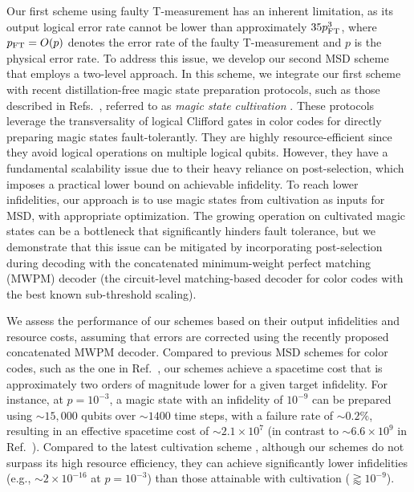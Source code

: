 \documentclass[
 prx,
 reprint,
 superscriptaddress,
 longbibliography,
 dvipsnames
]{revtex4-2}
\begin{document}
\label{para:ourfirstscheme}
Our first scheme using faulty T-measurement has an inherent limitation, as its output logical error rate cannot be lower than approximately $35p_{\mathrm{FT}}^3$, where $p_{\mathrm{FT}} = O(p)$ denotes the error rate of the faulty T-measurement and $p$ is the physical error rate.
To address this issue, we develop our second MSD scheme that employs a two-level approach. 
In this scheme, we integrate our first scheme with recent distillation-free magic state preparation protocols, such as those described in Refs.~\cite{chamberland2020very,itogawa2024even,gidney2024magic}, referred to as \textit{magic state cultivation} \cite{gidney2024magic}.
These protocols leverage the transversality of logical Clifford gates in color codes for directly preparing magic states fault-tolerantly.
They are highly resource-efficient since they avoid logical operations on multiple logical qubits.
However, they have a fundamental scalability issue due to their heavy reliance on post-selection, which imposes a practical lower bound on achievable infidelity.
To reach lower infidelities, our approach is to use magic states from cultivation as inputs for MSD, with appropriate optimization. 
The growing operation on cultivated magic states can be a bottleneck that significantly hinders fault tolerance, but we demonstrate that this issue can be mitigated by incorporating post-selection during decoding with the concatenated minimum-weight perfect matching (MWPM) decoder \cite{lee2025color} (the circuit-level matching-based decoder for color codes with the best known sub-threshold scaling).


We assess the performance of our schemes based on their output infidelities and resource costs, assuming that errors are corrected using the recently proposed concatenated MWPM decoder.
Compared to previous MSD schemes for color codes, such as the one in Ref.~\cite{beverland2021cost}, our schemes achieve a spacetime cost that is approximately two orders of magnitude lower for a given target infidelity.
For instance, at $p = 10^{-3}$, a magic state with an infidelity of $10^{-9}$ can be prepared using $\sim 15,000$ qubits over $\sim 1400$ time steps, with a failure rate of $\sim 0.2\%$, resulting in an effective spacetime cost of $\sim 2.1 \times 10^7$ (in contrast to $\sim 6.6 \times 10^9$ in Ref.~\cite{beverland2021cost}).
Compared to the latest cultivation scheme \cite{gidney2024magic}, although our schemes do not surpass its high resource efficiency, they can achieve significantly lower infidelities (e.g., $\sim 2 \times 10^{-16}$ at $p = 10^{-3}$) than those attainable with cultivation ($\gtrapprox 10^{-9}$).
\end{document}
